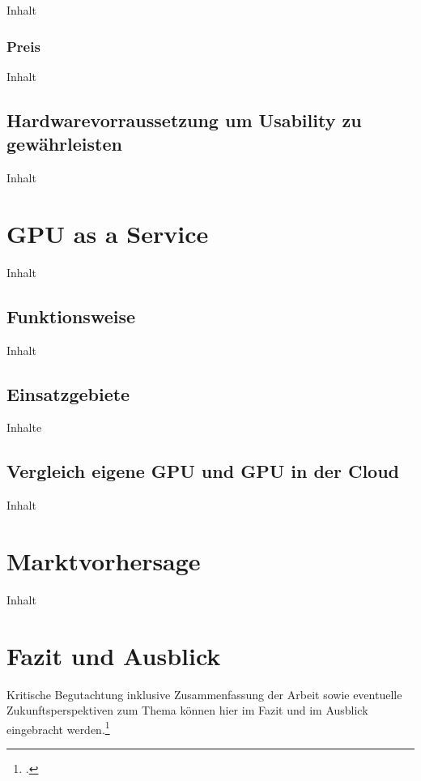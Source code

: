 \documentclass[12pt,toc=bib,toc=listof]{scrreprt}
\begin{document}
Inhalt

\subsection{Preis}
\label{sec:Preis}

Inhalt

\section{Hardwarevorraussetzung um Usability zu gewährleisten}
\label{sec:Hardwarevorraussetzung um Usability zu gewährleisten}

Inhalt

\chapter{GPU as a Service}
\label{sec:GPU as a Service}

Inhalt

\section{Funktionsweise}
\label{sec: Funktionsweise}

Inhalt

\section{Einsatzgebiete}
\label{sec: Einsatzgebiete}

Inhalte

\section{Vergleich eigene GPU und GPU in der Cloud}
\label{sec:Vergleich eigene GPU und GPU in der Cloud}

Inhalt

\chapter{Marktvorhersage}
\label{sec:Marktvorhersage}

Inhalt

\chapter{Fazit und Ausblick} %
\label{sec:fazit}

Kritische Begutachtung inklusive Zusammenfassung der Arbeit sowie eventuelle Zukunftsperspektiven zum Thema können hier im Fazit und im Ausblick eingebracht werden.\footcite [Vgl.] [] {HAN2016S30}
\end{document}

